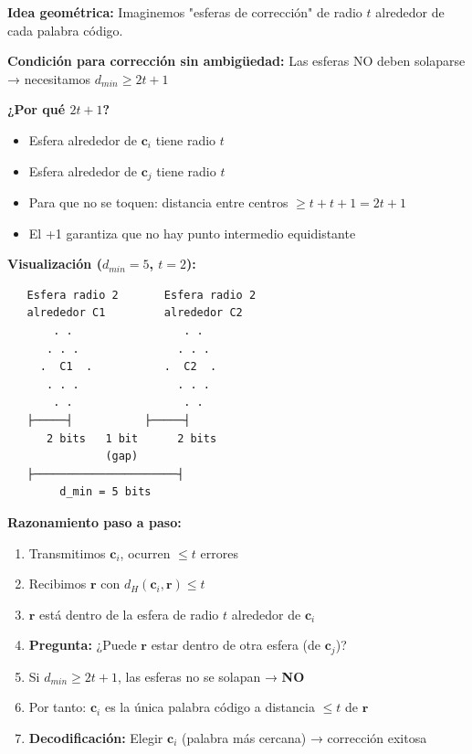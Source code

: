 \documentclass[10pt,a4paper]{article}
\begin{document}
\begin{tcolorbox}[colback=azulclaro!10,colframe=azuloscuro,title=🔧 Demostración - Corrección]
\textbf{Idea geométrica:} Imaginemos "esferas de corrección" de radio $t$ alrededor de cada palabra código.

\textbf{Condición para corrección sin ambigüedad:}
Las esferas NO deben solaparse → necesitamos $d_{min} \geq 2t + 1$

\textbf{¿Por qué $2t+1$?}
\begin{itemize}
\item Esfera alrededor de $\mathbf{c}_i$ tiene radio $t$
\item Esfera alrededor de $\mathbf{c}_j$ tiene radio $t$
\item Para que no se toquen: distancia entre centros $\geq t + t + 1 = 2t + 1$
\item El +1 garantiza que no hay punto intermedio equidistante
\end{itemize}

\textbf{Visualización ($d_{min}=5$, $t=2$):}
\begin{verbatim}
   Esfera radio 2       Esfera radio 2
   alrededor C1         alrededor C2
       . .                 . .
      . . .               . . .
     .  C1  .           .  C2  .
      . . .               . . .
       . .                 . .
   ├─────┤           ├─────┤
      2 bits   1 bit      2 bits
               (gap)
   ├──────────────────────┤
        d_min = 5 bits
\end{verbatim}

\textbf{Razonamiento paso a paso:}
\begin{enumerate}
\item Transmitimos $\mathbf{c}_i$, ocurren $\leq t$ errores
\item Recibimos $\mathbf{r}$ con $d_H(\mathbf{c}_i, \mathbf{r}) \leq t$
\item $\mathbf{r}$ está dentro de la esfera de radio $t$ alrededor de $\mathbf{c}_i$
\item \textbf{Pregunta:} ¿Puede $\mathbf{r}$ estar dentro de otra esfera (de $\mathbf{c}_j$)?
\item Si $d_{min} \geq 2t+1$, las esferas no se solapan → \textbf{NO}
\item Por tanto: $\mathbf{c}_i$ es la única palabra código a distancia $\leq t$ de $\mathbf{r}$
\item \textbf{Decodificación:} Elegir $\mathbf{c}_i$ (palabra más cercana) → corrección exitosa
\end{enumerate}
\end{tcolorbox}
\end{document}

